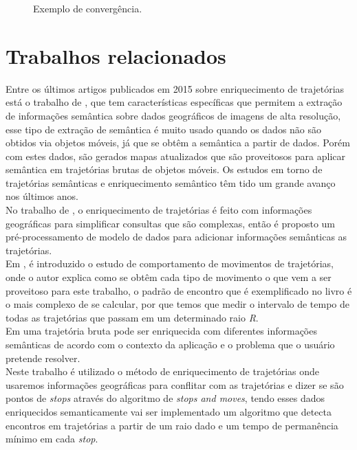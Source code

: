 \documentclass[	12pt, Times, openright, twoside, a4paper, english, brazil]{abntex2}
\begin{document}
\begin{figure}[ht]
\caption{Exemplo de convergência.\cite{Bogorny2012}\label{fig:convergencia}}
\end{figure}

\chapter{Trabalhos relacionados}
Entre os últimos artigos publicados em 2015 sobre enriquecimento de trajetórias está o trabalho de \cite{sublime2015}, que tem características específicas que permitem a extração de informações semântica sobre dados geográficos de imagens de alta resolução, esse tipo de extração de semântica é muito usado quando os dados não são obtidos via objetos móveis, já que se obtêm a semântica a partir de dados. Porém com estes dados, são gerados mapas atualizados que são proveitosos para aplicar semântica em trajetórias brutas de objetos móveis. Os estudos em torno de trajetórias semânticas e enriquecimento semântico têm tido um grande avanço nos últimos anos.\\
\indent No trabalho de \cite{alvares2007}, o enriquecimento de trajetórias é feito com informações geográficas para simplificar consultas que são complexas, então é proposto um pré-processamento de modelo de dados para adicionar informações semânticas as trajetórias.\\
\indent Em \cite{laube2005finding}, é introduzido o estudo de comportamento de movimentos de trajetórias, onde o autor explica como se obtêm cada tipo de movimento o que vem a ser proveitoso para este trabalho, o padrão de encontro que é exemplificado no livro é o mais complexo de se calcular, por que temos que medir o intervalo de tempo de todas as trajetórias que passam em um determinado raio \textit{R}.\\
\indent Em \cite{Bogorny2012} uma trajetória bruta pode ser enriquecida com diferentes informações semânticas de acordo com o contexto da aplicação e o problema que o usuário pretende resolver.\\
\indent Neste trabalho é utilizado o método de enriquecimento de trajetórias onde usaremos informações geográficas para conflitar com as trajetórias e dizer se são pontos de \textit{stops} através do algoritmo de \textit{stops and moves}, tendo esses dados enriquecidos semanticamente vai ser implementado um algoritmo que detecta encontros em trajetórias a partir de um raio dado e um tempo de permanência mínimo em cada \textit{stop}.
\end{document}
